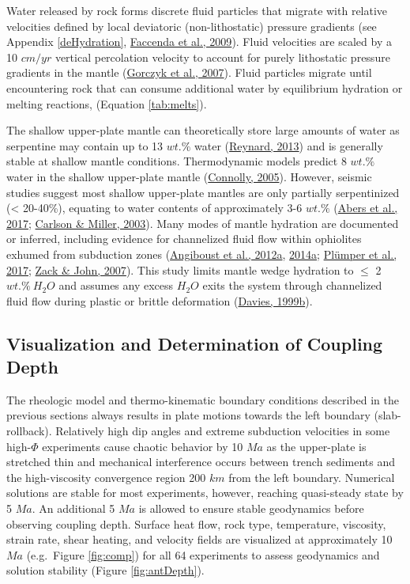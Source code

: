 Water released by rock forms discrete fluid particles that migrate with relative velocities defined by local deviatoric (non-lithostatic) pressure gradients (see Appendix \ref{deHydration}, \protect\hyperlink{ref-faccenda2009}{Faccenda et al., 2009}). Fluid velocities are scaled by a 10 \(cm/yr\) vertical percolation velocity to account for purely lithostatic pressure gradients in the mantle (\protect\hyperlink{ref-gorczyk2007}{Gorczyk et al., 2007}). Fluid particles migrate until encountering rock that can consume additional water by equilibrium hydration or melting reactions, (Equation \ref{tab:melts}).

The shallow upper-plate mantle can theoretically store large amounts of water as serpentine may contain up to 13 \(wt.\%\) water (\protect\hyperlink{ref-reynard2013}{Reynard, 2013}) and is generally stable at shallow mantle conditions. Thermodynamic models predict 8 \(wt.\%\) water in the shallow upper-plate mantle (\protect\hyperlink{ref-connolly2005}{Connolly, 2005}). However, seismic studies suggest most shallow upper-plate mantles are only partially serpentinized (\textless{} 20-40\%), equating to water contents of approximately 3-6 \(wt.\%\) (\protect\hyperlink{ref-abers2017}{Abers et al., 2017}; \protect\hyperlink{ref-carlson2003}{Carlson \& Miller, 2003}). Many modes of mantle hydration are documented or inferred, including evidence for channelized fluid flow within ophiolites exhumed from subduction zones (\protect\hyperlink{ref-angiboust2012a}{Angiboust et al., 2012a}, \protect\hyperlink{ref-angiboust2014a}{2014a}; \protect\hyperlink{ref-plumper2017}{Plümper et al., 2017}; \protect\hyperlink{ref-zack2007}{Zack \& John, 2007}). This study limits mantle wedge hydration to \(\leq\) 2 \(wt.\%~H_{2}O\) and assumes any excess \(H_{2}O\) exits the system through channelized fluid flow during plastic or brittle deformation (\protect\hyperlink{ref-davies1999a}{Davies, 1999b}).

\hypertarget{visualization-and-determination-of-coupling-depth}{%
\subsection{Visualization and Determination of Coupling Depth}\label{visualization-and-determination-of-coupling-depth}}

The rheologic model and thermo-kinematic boundary conditions described in the previous sections always results in plate motions towards the left boundary (slab-rollback). Relatively high dip angles and extreme subduction velocities in some high-\(\Phi\) experiments cause chaotic behavior by 10 \(Ma\) as the upper-plate is stretched thin and mechanical interference occurs between trench sediments and the high-viscosity convergence region 200 \(km\) from the left boundary. Numerical solutions are stable for most experiments, however, reaching quasi-steady state by 5 \(Ma\). An additional 5 \(Ma\) is allowed to ensure stable geodynamics before observing coupling depth. Surface heat flow, rock type, temperature, viscosity, strain rate, shear heating, and velocity fields are visualized at approximately 10 \(Ma\) (e.g.~Figure \ref{fig:comp}) for all 64 experiments to assess geodynamics and solution stability (Figure \ref{fig:antDepth}).

